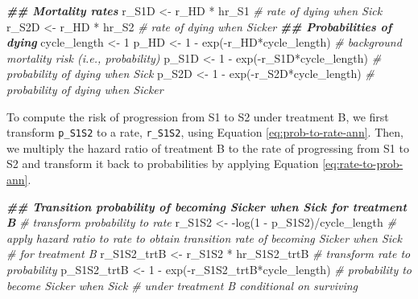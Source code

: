 \documentclass[
]{article}
\newenvironment{Shaded}{\begin{snugshade}}{\end{snugshade}}
\newcommand{\CommentTok}[1]{\textcolor[rgb]{0.56,0.35,0.01}{\textit{#1}}}
\newcommand{\DecValTok}[1]{\textcolor[rgb]{0.00,0.00,0.81}{#1}}
\newcommand{\DocumentationTok}[1]{\textcolor[rgb]{0.56,0.35,0.01}{\textbf{\textit{#1}}}}
\newcommand{\FunctionTok}[1]{\textcolor[rgb]{0.00,0.00,0.00}{#1}}
\newcommand{\NormalTok}[1]{#1}
\newcommand{\OtherTok}[1]{\textcolor[rgb]{0.56,0.35,0.01}{#1}}
\newcommand{\SpecialCharTok}[1]{\textcolor[rgb]{0.00,0.00,0.00}{#1}}
\begin{document}
\begin{Shaded}
\begin{Highlighting}[]
\DocumentationTok{\#\# Mortality rates}
\NormalTok{r\_S1D }\OtherTok{\textless{}{-}}\NormalTok{ r\_HD }\SpecialCharTok{*}\NormalTok{ hr\_S1 }\CommentTok{\# rate of dying when Sick}
\NormalTok{r\_S2D }\OtherTok{\textless{}{-}}\NormalTok{ r\_HD }\SpecialCharTok{*}\NormalTok{ hr\_S2 }\CommentTok{\# rate of dying when Sicker}
\DocumentationTok{\#\# Probabilities of dying}
\NormalTok{cycle\_length }\OtherTok{\textless{}{-}} \DecValTok{1}
\NormalTok{p\_HD  }\OtherTok{\textless{}{-}} \DecValTok{1} \SpecialCharTok{{-}} \FunctionTok{exp}\NormalTok{(}\SpecialCharTok{{-}}\NormalTok{r\_HD}\SpecialCharTok{*}\NormalTok{cycle\_length)  }\CommentTok{\# background mortality risk (i.e., probability)}
\NormalTok{p\_S1D }\OtherTok{\textless{}{-}} \DecValTok{1} \SpecialCharTok{{-}} \FunctionTok{exp}\NormalTok{(}\SpecialCharTok{{-}}\NormalTok{r\_S1D}\SpecialCharTok{*}\NormalTok{cycle\_length) }\CommentTok{\# probability of dying when Sick}
\NormalTok{p\_S2D }\OtherTok{\textless{}{-}} \DecValTok{1} \SpecialCharTok{{-}} \FunctionTok{exp}\NormalTok{(}\SpecialCharTok{{-}}\NormalTok{r\_S2D}\SpecialCharTok{*}\NormalTok{cycle\_length) }\CommentTok{\# probability of dying when Sicker}
\end{Highlighting}
\end{Shaded}

To compute the risk of progression from S1 to S2 under treatment B, we first transform \texttt{p\_S1S2} to a rate, \texttt{r\_S1S2}, using Equation \eqref{eq:prob-to-rate-ann}. Then, we multiply the hazard ratio of treatment B to the rate of progressing from S1 to S2 and transform it back to probabilities by applying Equation \eqref{eq:rate-to-prob-ann}.

\begin{Shaded}
\begin{Highlighting}[]
\DocumentationTok{\#\# Transition probability of becoming Sicker when Sick for treatment B}
\CommentTok{\# transform probability to rate}
\NormalTok{r\_S1S2 }\OtherTok{\textless{}{-}} \SpecialCharTok{{-}}\FunctionTok{log}\NormalTok{(}\DecValTok{1} \SpecialCharTok{{-}}\NormalTok{ p\_S1S2)}\SpecialCharTok{/}\NormalTok{cycle\_length}
\CommentTok{\# apply hazard ratio to rate to obtain transition rate of becoming Sicker when Sick }
\CommentTok{\# for treatment B}
\NormalTok{r\_S1S2\_trtB }\OtherTok{\textless{}{-}}\NormalTok{ r\_S1S2 }\SpecialCharTok{*}\NormalTok{ hr\_S1S2\_trtB}
\CommentTok{\# transform rate to probability}
\NormalTok{p\_S1S2\_trtB }\OtherTok{\textless{}{-}} \DecValTok{1} \SpecialCharTok{{-}} \FunctionTok{exp}\NormalTok{(}\SpecialCharTok{{-}}\NormalTok{r\_S1S2\_trtB}\SpecialCharTok{*}\NormalTok{cycle\_length) }\CommentTok{\# probability to become Sicker when Sick }
                                                  \CommentTok{\# under treatment B conditional on surviving}
\end{Highlighting}
\end{Shaded}
\end{document}
